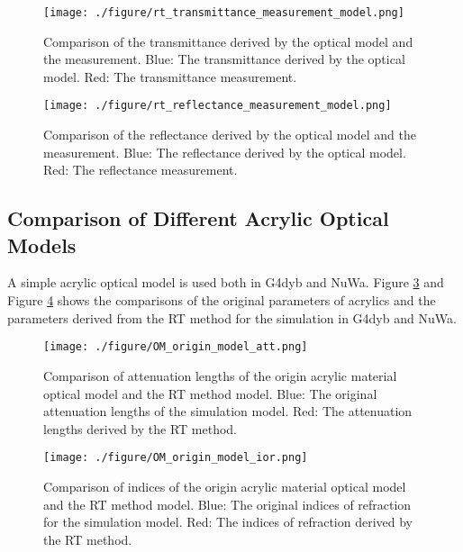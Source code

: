 \begin{figure}[h]
    \centering
    \texttt{[image: ./figure/rt\_transmittance\_measurement\_model.png]}
    \caption[Comparison of the transmittance derived by the optical model and the measurement]
{
Comparison of the transmittance derived by the optical model and the measurement.
Blue: The transmittance derived by the optical model.
Red: The transmittance measurement.
}
    \label{fig:fig:rt_transmittance_measurement_model.png}
    \end{figure}


\begin{figure}[h]
    \centering
    \texttt{[image: ./figure/rt\_reflectance\_measurement\_model.png]}
    \caption[Comparison of the reflectance derived by the optical model and the measurement.]
{
Comparison of the reflectance derived by the optical model and the measurement.
Blue: The reflectance derived by the optical model.
Red: The reflectance measurement.
}
    \label{}
    \end{figure}



\subsection{Comparison of Different Acrylic Optical Models}

A simple acrylic optical model is used both in G4dyb and NuWa. Figure \ref{fig:OM_origin_model_att.png} and
Figure \ref{fig:OM_origin_model_ior.png} shows the comparisons of the original parameters of acrylics
and the parameters derived from the RT method for the simulation in G4dyb and NuWa.


\begin{figure}[h]
    \centering
    \texttt{[image: ./figure/OM\_origin\_model\_att.png]}
    \caption[Comparison of attenuation length of the origin acrylic material optical model and the RT method model]
{
Comparison of attenuation lengths of the origin acrylic material optical model and the RT method model.
Blue: The original attenuation lengths of the simulation model.
Red: The attenuation lengths derived by the RT method.
}
    \label{fig:OM_origin_model_att.png}
    \end{figure}

\begin{figure}[h]
    \centering
    \texttt{[image: ./figure/OM\_origin\_model\_ior.png]}
    \caption[Comparison of indices of the origin acrylic material optical model and the RT method model]
{
Comparison of indices of the origin acrylic material optical model and the RT method model.
Blue: The original indices of refraction for the simulation model.
Red: The indices of refraction derived by the RT method.
}
    \label{fig:OM_origin_model_ior.png}
    \end{figure}



